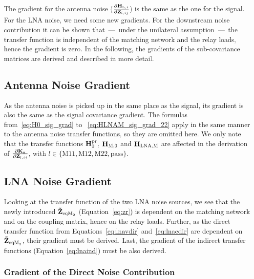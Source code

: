 The gradient for the antenna noise ($\frac{\partial\mathbf{H}_{\text{L,}i}}{\partial\mathbf{Z}_{l,ij}}$) is the same as the one for the signal.
For the LNA noise, we need some new gradients.
For the downstream noise contribution it can be shown that~---~under the unilateral assumption~---~the transfer function is independent of the matching network and the relay loads, hence the gradient is zero.
In the following, the gradients of the sub-covariance matrices are derived and described in more detail.


\subsection{Antenna Noise Gradient}
\label{sec:ant_noise_grad}
As the antenna noise is picked up in the same place as the signal, its gradient is also the same as the signal covariance gradient.
The formulas from~\eqref{eq:H0_sig_grad} to ~\eqref{eq:HLNAM_sig_grad_22} apply in the same manner to the antenna noise transfer functions, so they are omitted here.
We only note that the transfer functions $\mathbf{H}_0^{\text{pr}}$, $\mathbf{H}_\text{M,0}$ and $\mathbf{H}_\text{LNA,M}$ are affected in the derivation of $\frac{\partial\mathbf{K}_\text{n}}{\partial\mathbf{Z}_{l,ij}}$, with $l\in\{\text{M}11,\text{M}12,\text{M}22,\text{pass}\}$.

\subsection{LNA Noise Gradient}
\label{sec:lna_noise_grad}

Looking at the transfer function of the two LNA noise sources, we see that the newly introduced $\mathbf{\tilde{Z}}_{\text{eqM}_2}$ (Equation~\eqref{eq:zr}) is dependent on the matching network and on the coupling matrix, hence on the relay loads.
Further, as the direct transfer function from Equations~\eqref{eq:lnavdir} and~\eqref{eq:lnacdir} are dependent on $\mathbf{\tilde{Z}}_{\text{eqM}_2}$, their gradient must be derived.
Last, the gradient of the indirect transfer functions (Equation~\eqref{eq:lnaind}) must be also derived.

\subsubsection{Gradient of the Direct Noise Contribution}

